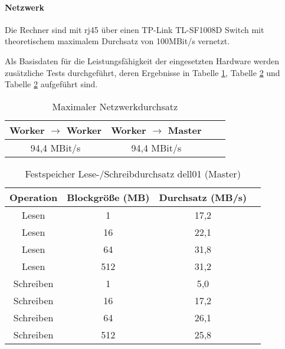 \paragraph{Netzwerk}
Die Rechner sind mit \gls{rj45} über einen TP-Link TL-SF1008D Switch mit theoretischem maximalem Durchsatz von 100MBit/s vernetzt.

Als Basisdaten für die Leistungsfähigkeit der eingesetzten Hardware werden zusätzliche Tests durchgeführt, deren Ergebnisse in Tabelle \ref{table:network}, Tabelle \ref{table:master_harddrive} und Tabelle \ref{table:master_harddrive} aufgeführt sind.

\begin{table}[ht]
	\centering %
	\begin{tabular}{c c c c} %
	\hline\hline %
	Worker $\rightarrow$ Worker & Worker $\rightarrow$ Master \\ [0.5ex] %
	\hline %
	94,4 MBit/s & 94,4 MBit/s\\ [1ex] 
	\hline %
	\end{tabular}
	\caption{Maximaler Netzwerkdurchsatz{\protect\footnotemark}} %
	\label{table:network} %
\end{table}

\begin{table}[ht]
	\centering %
	\begin{tabular}{c c c c} %
	\hline\hline %
	Operation & Blockgröße (MB) & Durchsatz (MB/s) \\ [0.5ex] %
	\hline %
	Lesen & 1 & 17,2 \\ 
	Lesen & 16 & 22,1 \\
	Lesen & 64 & 31,8 \\
	Lesen & 512 & 31,2 \\
	Schreiben & 1 & 5,0 \\
	Schreiben & 16 & 17,2 \\
	Schreiben & 64 & 26,1 \\
	Schreiben & 512 & 25,8 \\[1ex] 
	\hline %
	\end{tabular}
	\caption{Festspeicher Lese-/Schreibdurchsatz dell01 (Master){\protect\footnotemark}} %
	\label{table:master_harddrive} %
\end{table}


